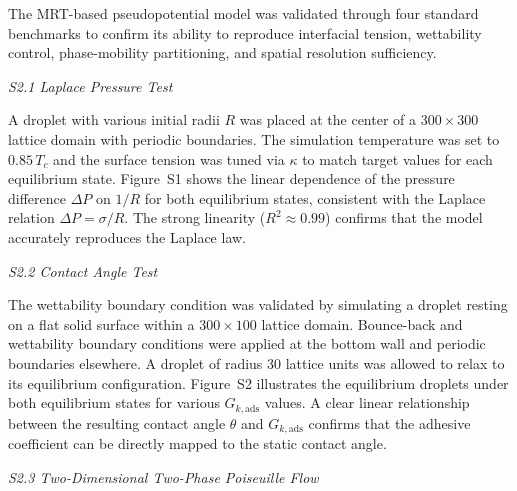 \documentclass[draft,wrr]{agutexSI2019}
\begin{document}
\begin{article}
The MRT-based pseudopotential model was validated through four standard
benchmarks to confirm its ability to reproduce interfacial tension, wettability
control, phase-mobility partitioning, and spatial resolution sufficiency.

\noindent\textit{S2.1 Laplace Pressure Test}

A droplet with various initial radii $R$ was placed at the center of a
$300 \times 300$ lattice domain with periodic boundaries. The simulation temperature
was set to $0.85\,T_c$ and the surface tension was tuned via $\kappa$ to match
target values for each equilibrium state. Figure~S1 shows the linear dependence of
the pressure difference $\Delta P$ on $1/R$ for both equilibrium states, consistent
with the Laplace relation $\Delta P = \sigma / R$. The strong linearity
($R^2 \approx 0.99$) confirms that the model accurately reproduces the Laplace law.

\noindent\textit{S2.2 Contact Angle Test}

The wettability boundary condition was validated by simulating a droplet resting on
a flat solid surface within a $300 \times 100$ lattice domain. Bounce-back and
wettability boundary conditions were applied at the bottom wall and periodic
boundaries elsewhere. A droplet of radius 30 lattice units was allowed to relax to
its equilibrium configuration. Figure~S2 illustrates the equilibrium droplets under
both equilibrium states for various $G_{k,\mathrm{ads}}$ values. A clear linear
relationship between the resulting contact angle $\theta$ and $G_{k,\mathrm{ads}}$
confirms that the adhesive coefficient can be directly mapped to the static contact
angle.

\noindent\textit{S2.3 Two-Dimensional Two-Phase Poiseuille Flow}


\end{article}
\end{document}
